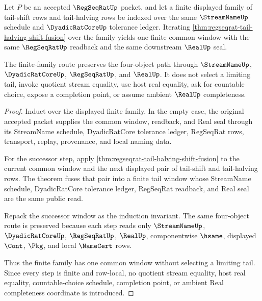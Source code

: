 \begin{theorem}
\label{thm:regseqrat-tail-shift-halving-fusion-choice-free}
Let $P$ be an accepted $\RegSeqRatUp$ packet, and let a finite displayed family of tail-shift rows and tail-halving rows be indexed over the same $\StreamNameUp$ schedule and $\DyadicRatCoreUp$ tolerance ledger. Iterating \autoref{thm:regseqrat-tail-halving-shift-fusion} over the family yields one finite common window with the same $\RegSeqRatUp$ readback and the same downstream $\RealUp$ seal.

The finite-family route preserves the four-object path through $\StreamNameUp$, $\DyadicRatCoreUp$, $\RegSeqRatUp$, and $\RealUp$. It does not select a limiting tail, invoke quotient stream equality, use host real equality, ask for countable choice, expose a completion point, or assume ambient $\RealUp$ completeness.
\end{theorem}
\begin{proof}
Induct over the displayed finite family. In the empty case, the original accepted packet supplies the common window, readback, and Real seal through its StreamName schedule, DyadicRatCore tolerance ledger, RegSeqRat rows, transport, replay, provenance, and local naming data.

For the successor step, apply \autoref{thm:regseqrat-tail-halving-shift-fusion} to the current common window and the next displayed pair of tail-shift and tail-halving rows. The theorem fuses that pair into a finite tail window whose StreamName schedule, DyadicRatCore tolerance ledger, RegSeqRat readback, and Real seal are the same public read.

Repack the successor window as the induction invariant. The same four-object route is preserved because each step reads only $\StreamNameUp$, $\DyadicRatCoreUp$, $\RegSeqRatUp$, $\RealUp$, componentwise $\hsame$, displayed $\Cont$, $\Pkg$, and local $\NameCert$ rows.

Thus the finite family has one common window without selecting a limiting tail. Since every step is finite and row-local, no quotient stream equality, host real equality, countable-choice schedule, completion point, or ambient Real completeness coordinate is introduced.
\end{proof}

